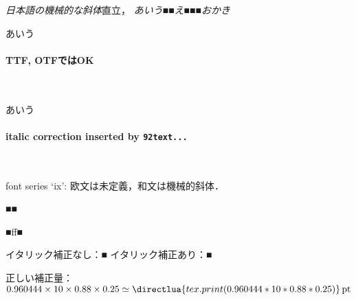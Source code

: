 \documentclass{ltjsarticle}
\begin{document}
\textsl{日本語の機械的な斜体}直立，
\textsl{あいう■\textup{■え■■}■おかき}

{\selectfont あいう}

\paragraph{TTF, OTFではOK}\ 


{\selectfont あいう}

\paragraph{italic correction inserted by {\tt\char92text...}}\

font series `ix': 欧文は未定義，和文は機械的斜体．

{\gt■■}

{\gt■ff■}

イタリック補正なし：{■}
イタリック補正あり：{■}


\bigskip

正しい補正量：$0.960444\times 10 \times 0.88\times 0.25 \simeq
\directlua{tex.print(0.960444*10*0.88*0.25)}\,\textrm{pt}$
\end{document}

